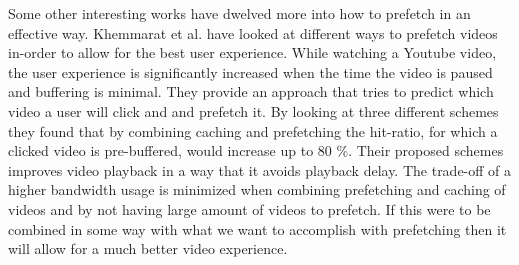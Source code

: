 Some other interesting works have dwelved more into how to prefetch in an effective way. Khemmarat et al. \cite{watchingprefetching} have looked at different ways to prefetch videos in-order to allow for the best user experience. While watching a Youtube video, the user experience is significantly increased when the time the video is paused and buffering is minimal. They provide an approach that tries to predict which video a user will click and and prefetch it. By looking at three different schemes they found that by combining caching and prefetching the hit-ratio, for which a clicked video is pre-buffered, would increase up to 80 \%. Their proposed schemes improves video playback in a way that it avoids playback delay. The trade-off of a higher bandwidth usage is minimized when combining prefetching and caching of videos and by not having large amount of videos to prefetch. If this were to be combined in some way with what we want to accomplish with prefetching then it will allow for a much better video experience.

